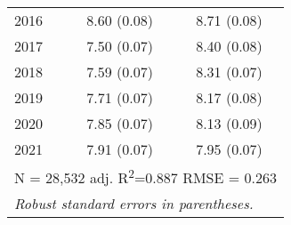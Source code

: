 \begin{tabular}{lcc}
2016                  &   8.60 (0.08)                         &        8.71 (0.08)                    \\
2017                  &   7.50 (0.07)                         &        8.40 (0.08)                    \\
2018                  &   7.59 (0.07)                         &        8.31 (0.07)                    \\
2019                  &   7.71 (0.07)                         &        8.17 (0.08)                    \\
2020                  &   7.85 (0.07)                         &        8.13 (0.09)                    \\
2021                  &   7.91 (0.07)                         &        7.95 (0.07)                    \\ \cline{1-3} 
\multicolumn{3}{r}{\footnotesize \tstrut N = 28,532  \quad   adj. R\textsuperscript{2}=0.887   \quad  RMSE = 0.263}     \\  \cline{1-3}            
\multicolumn{3}{l}{\footnotesize \textit{Robust standard errors in parentheses.}}           
\end{tabular}